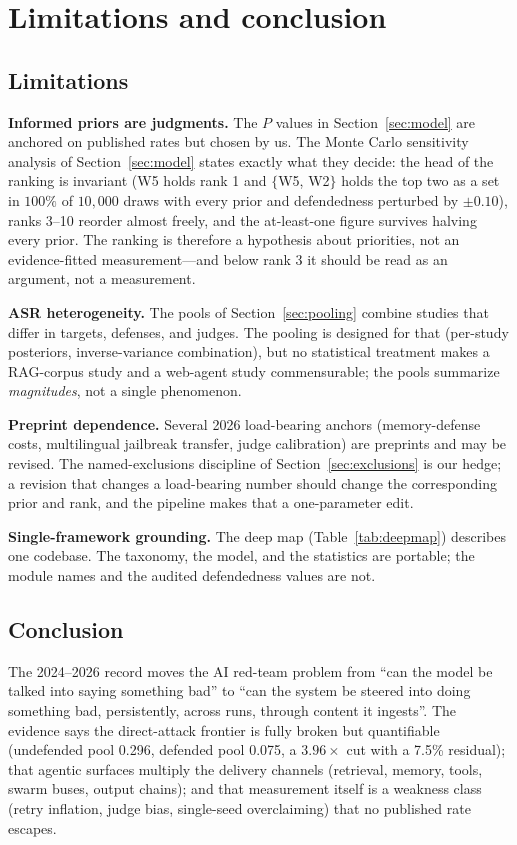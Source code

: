 \section{Limitations and conclusion}\label{sec:end}

\subsection{Limitations}

\textbf{Informed priors are judgments.} The $P$ values in
Section~\ref{sec:model} are anchored on published rates but chosen by us. The
Monte Carlo sensitivity analysis of Section~\ref{sec:model} states exactly what
they decide: the head of the ranking is invariant (W5 holds rank 1 and
$\{$W5, W2$\}$ holds the top two as a set in $100\%$ of $10{,}000$ draws with
every prior and defendedness perturbed by $\pm0.10$), ranks 3--10 reorder
almost freely, and the at-least-one figure survives halving every prior. The
ranking is therefore a hypothesis about priorities, not an evidence-fitted
measurement---and below rank 3 it should be read as an argument, not a
measurement.

\textbf{ASR heterogeneity.} The pools of Section~\ref{sec:pooling} combine
studies that differ in targets, defenses, and judges. The pooling is designed
for that (per-study posteriors, inverse-variance combination), but no
statistical treatment makes a RAG-corpus study and a web-agent study
commensurable; the pools summarize \emph{magnitudes}, not a single phenomenon.

\textbf{Preprint dependence.} Several 2026 load-bearing anchors (memory-defense
costs, multilingual jailbreak transfer, judge calibration) are preprints and may
be revised. The named-exclusions discipline of Section~\ref{sec:exclusions} is
our hedge; a revision that changes a load-bearing number should change the
corresponding prior and rank, and the pipeline makes that a one-parameter edit.

\textbf{Single-framework grounding.} The deep map (Table~\ref{tab:deepmap})
describes one codebase. The taxonomy, the model, and the statistics are
portable; the module names and the audited defendedness values are not.

\subsection{Conclusion}

The 2024--2026 record moves the AI red-team problem from ``can the model be
talked into saying something bad'' to ``can the system be steered into doing
something bad, persistently, across runs, through content it ingests''. The
evidence says the direct-attack frontier is fully broken but quantifiable
(undefended pool 0.296, defended pool 0.075, a $3.96\times$ cut with a
7.5\% residual); that agentic surfaces multiply the delivery channels (retrieval,
memory, tools, swarm buses, output chains); and that measurement itself is a
weakness class (retry inflation, judge bias, single-seed overclaiming) that no
published rate escapes.

